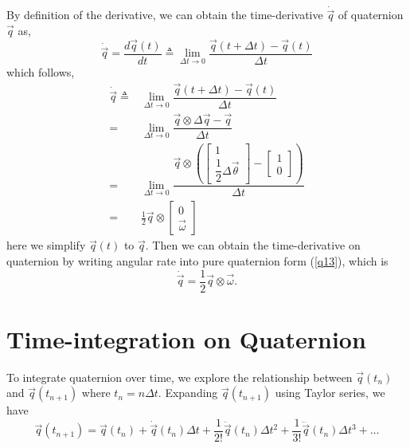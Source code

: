 By definition of the derivative, we can obtain the time-derivative $\dot{\vec{q}}$ of quaternion $\vec{q}$ as,
\begin{equation} \label{q32} 
	\dot{\vec{q}} = \dfrac{d\vec{q}(t)}{dt} \triangleq \lim_{\Delta{t} \rightarrow 0} \dfrac{\vec{q}(t+\Delta t) - \vec{q}(t)}{\Delta{t}}
\end{equation}
which follows,
\begin{equation} \label{q33} 
\begin{split}
	\dot{\vec{q}} \triangleq & \lim_{\Delta{t} \rightarrow 0} \dfrac{\vec{q}(t+\Delta t) - \vec{q}(t)}{\Delta{t}} \\
	=& \lim_{\Delta{t} \rightarrow 0} \dfrac{\vec{q} \otimes \Delta\vec{q} - \vec{q}}{\Delta{t}} \\
	=& \lim_{\Delta{t} \rightarrow 0} \dfrac{\vec{q} \otimes (\begin{bmatrix} 1 \\ \dfrac{1}{2}\Delta{\vec{\theta}} \end{bmatrix} - \begin{bmatrix} 1 \\ 0 \end{bmatrix})}{\Delta{t}} \\
	=& \frac{1}{2}\vec{q} \otimes \begin{bmatrix} 0 \\ \vec{\omega} \end{bmatrix} 
\end{split}
\end{equation}
here we simplify $\vec{q}(t)$ to $\vec{q}$. Then we can obtain the time-derivative on quaternion by writing angular rate into pure quaternion form (\ref{q13}), which is
\begin{equation} \label{q34} 
	\dot{\vec{q}} = \frac{1}{2}\vec{q} \otimes \vec{\omega}.
\end{equation}				  

\section{Time-integration on Quaternion}
\label{sec:timei_on_quat}

To integrate quaternion over time, we explore the relationship between $\vec{q}(t_n)$ and $\vec{q}(t_{n+1})$ where $t_n = n\Delta{t}$. Expanding $\vec{q}(t_{n+1})$ using Taylor series, we have
\begin{equation} \label{q35} 
	\vec{q}(t_{n+1}) = \vec{q}(t_n) + \dot{\vec{q}}(t_n)\Delta{t} + \frac{1}{2!}\ddot{\vec{q}}(t_n)\Delta{t}^2 + \frac{1}{3!}\dddot{\vec{q}}(t_n)\Delta{t}^3+\dots
\end{equation}

